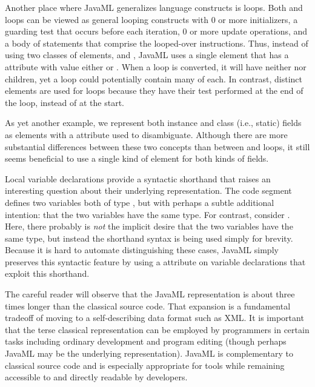 \documentclass{article}
\begin{document}
\begin{multicols}{2}
Another place where JavaML generalizes language constructs is loops.
Both  and  loops can be viewed as general
looping constructs with 0 or more initializers, a guarding test that
occurs before each iteration, 0 or more update operations, and a body of
statements that comprise the looped-over instructions.  Thus, instead of
using two classes of elements,  and
, JavaML uses a single  element that
has a  attribute with value either  or
.  When a  loop is converted, it will
have neither  nor  children, yet
a  loop could potentially contain many of each.  In
contrast, distinct  elements are used for
 loops because they have their test performed at the end of
the loop, instead of at the start.

      
As yet another example, we represent both instance and class (i.e.,
static) fields as  elements with a 
attribute used to disambiguate.  Although there are more substantial
differences between these two concepts than between 
and  loops, it still seems beneficial to use a single
kind of element for both kinds of fields.

Local variable declarations provide a syntactic shorthand that raises an
interesting question about their underlying representation.  The code
segment  defines two variables both of type
, but with perhaps a subtle additional intention: that the
two variables have the same type.  For contrast, consider .  Here, there probably is \emph{not} the implicit desire
that the two variables have the same type, but instead the shorthand
syntax is being used simply for brevity.  Because it is hard to automate
distinguishing these cases, JavaML simply preserves this syntactic
feature by using a  attribute on variable
declarations that exploit this shorthand.

The careful reader will observe that the JavaML representation is about
three times longer than the classical source code.  That expansion is a
fundamental tradeoff of moving to a self-describing data format such as
XML.  It is important that the terse classical representation can be
employed by programmers in certain tasks including ordinary development
and program editing (though perhaps JavaML may be the underlying
representation).  JavaML is complementary to classical source
code and is especially appropriate for tools while remaining
accessible to and directly readable by developers.


\end{multicols}
\end{document}
